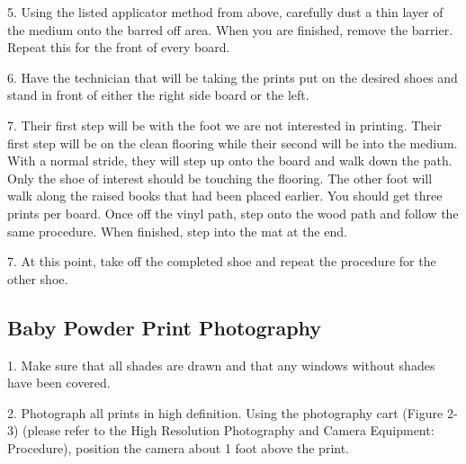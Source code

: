 5. Using the listed applicator method from above, carefully dust a thin layer of the medium onto the barred off area. When you are finished, remove the barrier. Repeat this for the front of every board.

6. Have the technician that will be taking the prints put on the desired shoes and stand in front of either the right side board or the left.

7. Their first step will be with the foot we are not interested in printing. Their first step will be on the clean flooring while their second will be into the medium. With a normal stride, they will step up onto the board and walk down the path. Only the shoe of interest should be touching the flooring. The other foot will walk along the raised books that had been placed earlier.  You should get three prints per board. Once off the vinyl path, step onto the wood path and follow the same procedure. When finished, step into the mat at the end.

7. At this point, take off the completed shoe and repeat the procedure for the other shoe.

\subsection{Baby Powder Print Photography}

1. Make sure that all shades are drawn and that any windows without shades have been covered.

2. Photograph all prints in high definition. Using the photography cart (Figure 2-3) (please refer to the High Resolution Photography and Camera Equipment: Procedure), position the camera about 1 foot above the print.

